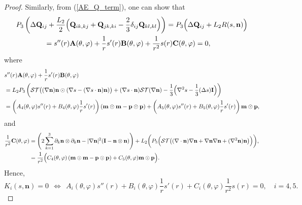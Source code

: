 \documentclass[10pt, a4paper]{article}
\newcommand\n{\mathbf{n}}
\newcommand\m{\mathbf{m}}
\newcommand\p{\mathbf{p}}
\newcommand\Qvec{\mathbf{Q}}
\newcommand\pp{\partial}
\begin{document}
\begin{proof}
Similarly, from (\ref{AE_Q_term}), one can show that
\begin{equation}\label{AE_extra}
\begin{aligned}
  & P_3 \left(\Delta \Qvec_{ij} + \frac{L_2}{2} \Bigl( \Qvec_{ik,kj} + \Qvec_{jk,ki}  - \frac{2}{3} \delta_{ij} \Qvec_{kl, kl} \Bigr) \right) = P_3\Bigl( \Delta \Qvec_{ij} + L_2 R(s, \n) \Bigr) \\
  & \qquad \qquad = s''(r) \mathbf{A} (\theta, \varphi)  +  \frac{1}{r}s'(r) \mathbf{B} (\theta, \varphi) +  \frac{1}{r^2}s(r) \mathbf{C} (\theta, \varphi) = 0, \\
  \end{aligned}
\end{equation}
where
\begin{equation}\label{AE_Eaxta_Coe_AB}
\begin{aligned}
& s''(r) \mathbf{A} (\theta, \varphi)  +  \frac{1}{r}s'(r) \mathbf{B} (\theta, \varphi) \\
&  = L_2 P_3 \left( \mathcal{ST} \bigl( (\nabla \n) \n \odot (\nabla s - (\nabla s \cdot \n) \n ) \bigr) + (\nabla s \cdot \n) \mathcal{ST}(\nabla \n) - \dfrac{1}{3} \Bigl( \nabla^2 s - \dfrac{1}{3} (\Delta s) \mathbf{I} \Bigr)  \right) \\
&  = \left( A_4(\theta, \varphi)s''(r) + B_4(\theta, \varphi) \dfrac{1}{r} s'(r)  \right) \left( \m \odot \m - \p \odot \p \right)  + \left( A_5(\theta, \varphi)s''(r) + B_5(\theta, \varphi) \dfrac{1}{r} s'(r)  \right) \m \odot \p, \\
\end{aligned}
\end{equation}
and
\begin{equation}\label{AE_Eaxta_Coe_C}
\begin{aligned}
 \frac{1}{r^2} \mathbf{C} (\theta, \varphi)  & = \left( 2 \sum_{k=1}^3 \pp_k \n \otimes \pp_k \n  - |\nabla \n|^2( \mathbf{I} - \n \otimes \n) \right) + L_2  \biggl( P_3 \Bigl(  \mathcal{ST} \bigl( (\nabla \cdot \n)\nabla \n + \nabla \n \nabla \n + (\nabla^2 \n)\n \bigr) \Bigr) \biggr), \\ 
 & =  \frac{1}{r^2} \Bigl( C_4(\theta, \varphi) \left( \m \odot \m - \p \odot \p \right)  + C_5(\theta, \varphi)\m \odot \p \Bigr). \\ 
\end{aligned}
\end{equation}
Hence, 
\begin{equation}\label{AE_Extra_2}
K_i (s, \n) = 0 ~~\Longleftrightarrow~~ A_i(\theta, \varphi) s''(r) + B_i(\theta, \varphi) \frac{1}{r} s'(r) + C_i(\theta, \varphi) \frac{1}{r^2} s(r) = 0, \quad i = 4, 5.
\end{equation}


\end{proof}
\end{document}
